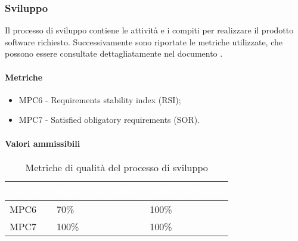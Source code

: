 \subsubsection{Sviluppo}
Il processo di sviluppo contiene le attività e i compiti per realizzare il prodotto software richiesto. Successivamente sono riportate le metriche utilizzate, che possono essere consultate dettagliatamente nel documento .

\paragraph{Metriche}
\begin{itemize}
	\item MPC6 - Requirements stability index (RSI);
	\item MPC7 - Satisfied obligatory requirements (SOR).
\end{itemize}


\paragraph{Valori ammissibili}
{
\renewcommand{\arraystretch}{1.5}
\centering
\begin{longtable}{C{2.5cm} C{4cm} C{4cm}}
\textcolor{white}{\textbf{Metrica}}&
\textcolor{white}{\textbf{Valori accettabile}}&
\textcolor{white}{\textbf{Valore ottimale}}\\	
\endhead
\endfoot
{}\caption{Metriche di qualità del processo di sviluppo}
\endlastfoot

MPC6 & 70\% & 100\% \\
MPC7 & 100\% & 100\%
\end{longtable}
}

